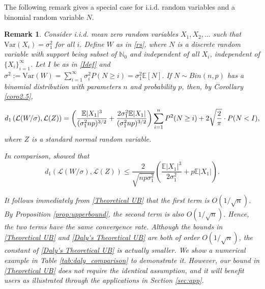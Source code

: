 \documentclass[pdflatex,sn-mathphys-ay]{sn-jnl}
\newcommand{\E}{\mathbb{E}}
\newcommand{\Var}{\mathrm{Var}}
\newtheorem{remark}[theorem]{Remark}
\theoremstyle{thmstyleone}%
\theoremstyle{thmstyletwo}%
\newtheorem{remark}{Remark}%
\theoremstyle{thmstylethree}%
\begin{document}
The following remark gives a special case for i.i.d. random variables and a binomial random variable $N$.
\begin{remark} \label{Remark:BN} Consider i.i.d. mean zero random variables $X_1,X_2, \dots$  such that $\Var(X_i) = \sigma^2_1$ for all $i$. Define $W$ as in \eqref{rs}, where $N$ is  a discrete random variable with support being subset of $\mathbb{N}_0$ and independent of all $X_i$, independent of $\{X_i\}_{i=1}^\infty$. Let $I$ be as in \eqref{Idef} and \\${\sigma}^2 := \Var(W) = \sum_{i=1}^\infty\sigma_i^2 P(N\ge i)=\sigma^2_1\E[N]$. If $N\sim Bin(n,p)$ has a binomial distribution with parameters $n$ and probability $p$, then, by Corollary \ref{coro2.5}, 

\begin{equation}  \label{Theoretical UB}
    d_1\left(\mathcal{L}(W/{\sigma}), \mathcal{L}(Z) \right)= \left({\E|X_1|^3 \over (\sigma^2_1 np)^{3/2}} +{2\sigma_1^2\E|X_1|\over (\sigma^2_1np)^{3/2}}\right)\sum_{i=1}^n P^2(N\ge i)  +2 \sqrt{\frac{2}{\pi}}\cdot\displaystyle P(N<I),\end{equation} 
    where $Z$ is a standard normal random variable.
\begin{comment}
\begin{equation}  \label{Theoretical UB}
    d_1\left(\mathcal{L}(W/{\sigma}), \mathcal{L}(Z) \right)= \left({\E|X_1|^3 \over (\sigma^2_1 np)^{3/2}} +{2\sigma_1^2\E|X_1|\over (\sigma^2_1np)^{3/2}}\right)\sum_{i=1}^n P^2(N\ge i)  +{2\sqrt{2} \over \sqrt{\pi}}\cdot\displaystyle{\left(1-{1\over np}\sum_{i=1}^nP^2(N\ge i)\right)},\end{equation} \todo{Modify}
    where $Z$ is a standard normal random variable.
\end{comment}

In comparison, \cite{Dal22} showed that 
\begin{equation} \label{Daly's Theoretical UB}
d_1\left(\mathcal{L}(W/{\sigma}), \mathcal{L}(Z) \right)\le \frac{2}{\sqrt{np\sigma^2_1}}\left(\frac{\E|X_1|^3}{2\sigma^2_1}+p\E|X_1| \right).
\end{equation}

It follows immediately from \eqref{Theoretical UB} that the first term is $O(1/\sqrt{n})$. By Proposition \ref{prop:upperbound}, the second term is also $O(1/\sqrt{n})$. Hence, the two terms have the same convergence rate. Although the bounds in \eqref{Theoretical UB} and \eqref{Daly's Theoretical UB} are both of order $O(1/\sqrt{n})$, the constant of  \eqref{Daly's Theoretical UB} is actually smaller. We show a numerical example in Table \ref{tab:daly_comparison} to demonstrate it. However, our bound in \eqref{Theoretical UB} does not require the identical assumption, and it will benefit users as illustrated through the applications in Section \ref{sec:app}.  
\end{remark}
\end{document}
